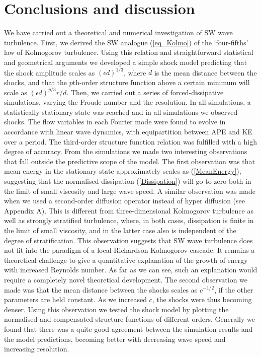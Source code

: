 \section{Conclusions and discussion}

We have carried out a theoretical and numerical investigation of SW wave
turbulence. First, we derived the SW analogue (\ref{eq_Kolmo}) of the
`four-fifths' law of Kolmogorov turbulence. Using this relation and
straightforward statistical and geometrical arguments we developed a simple
shock model predicting that the shock amplitude scales as $ (\epsilon d)^{1/3}
$, where $ d $ is the mean distance between the shocks, and that the
$ p $th-order structure function above a certain minimum will scale as
$ (\epsilon d)^{p/3} r/d $. Then, we carried out a series of forced-dissipative
simulations, varying the Froude number and the resolution. In all simulations,
a statistically stationary state was reached and in all simulations we
observed shocks. The flow variables in each Fourier mode were found to evolve
in accordance with linear wave dynamics, with equipartition between APE and KE
over a period. The third-order structure function relation was fulfilled with a
high degree of accuracy. From the simulations we made two interesting
observations that fall outside the predictive scope of the model. The first
observation was that mean energy in the stationary state approximately scales
as (\ref{MeanEnergy}), suggesting that the normalised dissipation
(\ref{Dissipation}) will go to zero both in the limit of small viscosity and
large wave speed. A similar observation was made when we used a second-order diffusion operator instead of hyper diffusion (see Appendix A).
This is different from three-dimensional Kolmogorov
turbulence as well as strongly stratified turbulence, where, in both cases,
dissipation is finite in the limit of small viscosity, and in the latter case
also is independent of the degree of stratification. This observation suggests
that SW wave turbulence does not fit into the paradigm of a local
Richardson-Kolmogorov cascade.  It remains a theoretical challenge to give a quantitative explanation of the growth of energy with increased Reynolds number.
As far as we can see, such an explanation would require a completely novel theoretical development.
The second observation we made was that the mean
distance between the shocks scales as $ c^{-1/2} $, if the other parameters are
held constant. As we increased $ c $, the shocks were thus becoming denser.
Using this observation we tested the shock model by plotting the normalised and
compensated structure functions of different orders. Generally we found that
there was a quite good agreement between the simulation results and the model
predictions, becoming better with decreasing wave speed and increasing
resolution.

